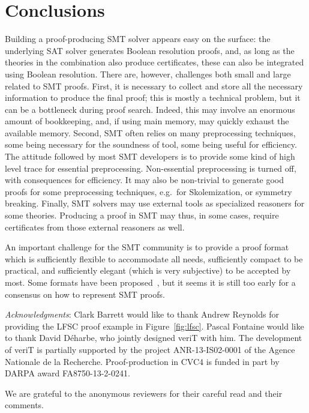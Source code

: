 \documentclass{llncs}
\begin{document}
\section{Conclusions}
\label{sec:concl}


Building a proof-producing SMT solver appears easy on the surface: the underlying SAT solver
generates Boolean resolution proofs, and, as long as the theories in the combination also
produce certificates, these can also be integrated using Boolean resolution.
There are, however, challenges both small and large related to SMT
proofs.  First, it is necessary to collect and store all the necessary
information to produce the final proof; this is mostly a technical problem, but
it can be a bottleneck during proof search.  Indeed, this may involve an
enormous amount of bookkeeping, and, if using main memory, may quickly
exhaust the available memory.  Second, SMT often relies on many preprocessing
techniques, some being necessary for the soundness of tool, some being useful
for efficiency.  The attitude followed by most SMT developers is to provide some
kind of high level trace for essential preprocessing.  Non-essential
preprocessing is turned off, with consequences for efficiency.  It
may also be non-trivial to generate good proofs for some preprocessing
techniques, e.g.\ for Skolemization, or symmetry breaking.  Finally, SMT
solvers may use external tools as specialized reasoners for some
theories.
Producing a proof in SMT may thus, in some cases, require certificates from
those external reasoners as well.

An important challenge for the SMT community is to provide a proof format which
is sufficiently flexible to accommodate all needs, sufficiently compact to be
practical, and sufficiently elegant (which is very subjective) to be accepted by
most.  Some formats have been proposed~\cite{Besson1,dMB08,Reynolds1}, but it
seems it is still too early for a consensus on how to represent SMT proofs.


\medskip\noindent%
\emph{Acknowledgments}: Clark Barrett would like to thank Andrew Reynolds for
providing the LFSC proof example in Figure~\ref{fig:lfsc}.  Pascal Fontaine
would like to thank David D\'{e}harbe, who jointly designed veriT with him.  The
development of veriT is partially supported by the project ANR-13-IS02-0001 of
the Agence Nationale de la Recherche.  Proof-production in CVC4 is funded in
part by DARPA award FA8750-13-2-0241.

We are grateful to the anonymous reviewers for their careful read and their
comments.



\end{document}
